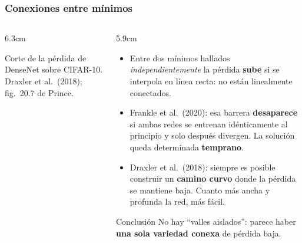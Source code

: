 \documentclass[aspectratio=169, 10pt]{beamer}
\newcommand{\fuente}[1]{{\scriptsize\color{StanfordGray}#1}}
\begin{document}
\begin{frame}
\frametitle{Conexiones entre mínimos}
\footnotesize %
\begin{columns}[c]
\begin{column}{6.3cm}
\begin{center}
\end{center}
\vspace{-0.2em}
\fuente{Corte de la p\'erdida de DenseNet sobre CIFAR-10. Draxler et al.\ (2018); fig.~20.7 de Prince.}
\end{column}
\begin{column}{5.9cm}
\begin{itemize}
	\item Entre dos m\'inimos hallados \emph{independientemente} la p\'erdida \textbf{sube} si se interpola en l\'inea recta: no est\'an linealmente conectados.
	\item Frankle et al.\ (2020): esa barrera \textbf{desaparece} si ambas redes se entrenan id\'enticamente al principio y solo despu\'es divergen. La soluci\'on queda determinada \textbf{temprano}.
	\item Draxler et al.\ (2018): siempre es posible construir un \textbf{camino curvo} donde la p\'erdida se mantiene baja. Cuanto m\'as ancha y profunda la red, m\'as f\'acil.
\end{itemize}
\vspace{0.3em}
\begin{exampleblock}{Conclusión}
\footnotesize
No hay ``valles aislados'': parece haber \textbf{una sola variedad conexa} de p\'erdida baja.
\end{exampleblock}
\end{column}
\end{columns}
\end{frame}
\end{document}
